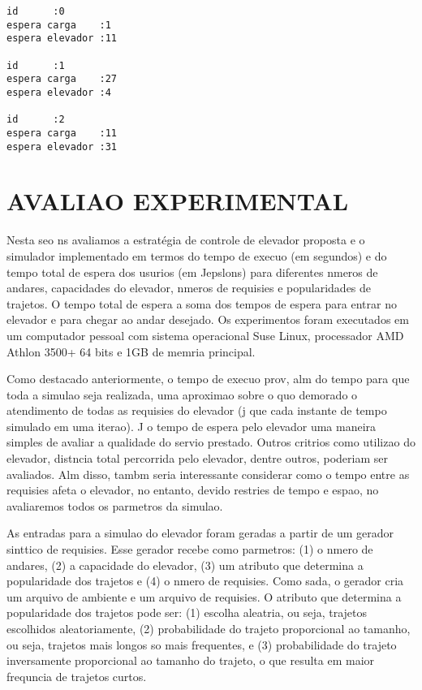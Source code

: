 \documentclass[12pt]{article}
\begin{document}
\begin{footnotesize}
\begin{verbatim}
id		:0
espera carga	:1
espera elevador	:11

id		:1
espera carga	:27
espera elevador	:4

id		:2
espera carga	:11
espera elevador	:31
\end{verbatim}
\end{footnotesize}


\section{AVALIAO EXPERIMENTAL}
\label{avaliacao_experimental}


Nesta seo ns avaliamos a estratégia de controle de elevador proposta e o simulador implementado em termos do tempo de execuo (em segundos) e do tempo total de espera dos usurios (em Jepslons) para diferentes nmeros de andares, capacidades do elevador, nmeros de requisies e popularidades de trajetos. O tempo total de espera  a soma dos tempos de espera para entrar no elevador e para chegar ao andar desejado. Os experimentos foram executados em um computador pessoal com sistema operacional Suse Linux, processador AMD Athlon 3500+ 64 bits e 1GB de memria principal.

Como destacado anteriormente, o tempo de execuo prov, alm do tempo para que toda a simulao seja realizada, uma aproximao sobre o quo demorado  o atendimento de todas as requisies do elevador (j que cada instante de tempo  simulado em uma iterao). J o tempo de espera pelo elevador  uma maneira simples de avaliar a qualidade do servio prestado. Outros critrios como utilizao do elevador, distncia total percorrida pelo elevador, dentre outros, poderiam ser avaliados. Alm disso, tambm seria interessante considerar como o tempo entre as requisies afeta o elevador, no entanto, devido  restries de tempo e espao, no avaliaremos todos os parmetros da simulao.

As entradas para a simulao do elevador foram geradas a partir de um gerador sinttico de requisies. Esse gerador recebe como parmetros: (1) o nmero de andares, (2) a capacidade do elevador, (3) um atributo que determina a popularidade dos trajetos e (4) o nmero de requisies. Como sada, o gerador cria um arquivo de ambiente e um arquivo de requisies. O atributo que determina a popularidade dos trajetos pode ser: (1) escolha aleatria, ou seja, trajetos escolhidos aleatoriamente, (2) probabilidade do trajeto proporcional ao tamanho, ou seja, trajetos mais longos so mais frequentes, e (3) probabilidade do trajeto inversamente proporcional ao tamanho do trajeto, o que resulta em maior frequncia de trajetos curtos.
\end{document}
